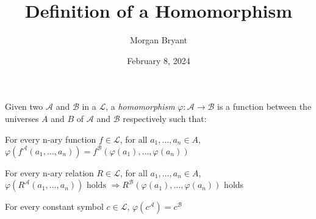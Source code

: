 \documentclass[a4paper]{article}
\title{Definition of a Homomorphism}
\date{February 8, 2024}
\author{Morgan Bryant}
\begin{document}
\maketitle
\par{Given two  \(\mathcal {A}\) and \(\mathcal {B}\) in a  \(\mathcal {L}\), a \emph{homomorphism} \(\varphi :  \mathcal {A}  \rightarrow   \mathcal {B}\)
is a function between the universes \(A\) and \(B\) of \(\mathcal {A}\) and \(\mathcal {B}\) respectively such that:}\par{ For every n-ary function \(f \in   \mathcal {L}\), for all \(a_1, \dots , a_n \in  A\), \(\varphi (f^{ \mathcal {A}}(a_1, \dots , a_n)) = f^{ \mathcal {B}}( \varphi (a_1), \dots ,  \varphi (a_n))\)}\par{For every n-ary relation \(R \in   \mathcal {L}\), for all \(a_1, \dots , a_n  \in  A\), \(\varphi (R^{ \mathcal {A}}(a_1, \dots , a_n))  \text { holds }  \Rightarrow  R^{ \mathcal {B}}( \varphi (a_1),  \dots ,  \varphi (a_n))\) holds}\par{For every constant symbol \(c  \in   \mathcal {L}\), \(\varphi (c^{ \mathcal {A}}) =c^{ \mathcal {B}}\)}
\printbibliography
\end{document}
